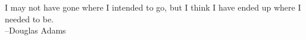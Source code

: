 \thispagestyle{plain}

\vspace*{80mm}
\begin{flushright}
I may not have gone where I intended to go,
but I think I have ended up where I needed to be.\\
--Douglas Adams
\end{flushright}

